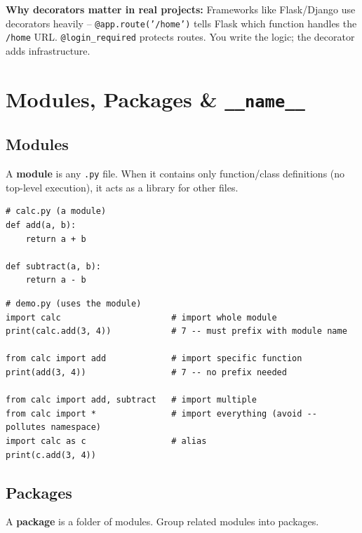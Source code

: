 \documentclass[12pt,a4paper]{article}
\newcommand{\code}[1]{\texttt{\small\color{pyblue}#1}}
\begin{document}
\begin{notebox}
\textbf{Why decorators matter in real projects:} Frameworks like Flask/Django use decorators heavily -- \code{@app.route('/home')} tells Flask which function handles the \code{/home} URL. \code{@login\_required} protects routes. You write the logic; the decorator adds infrastructure.
\end{notebox}

\section{Modules, Packages \& \texttt{\_\_name\_\_}}

\subsection{Modules}

A \textbf{module} is any \code{.py} file. When it contains only function/class definitions (no top-level execution), it acts as a library for other files.

\begin{lstlisting}
# calc.py (a module)
def add(a, b):
    return a + b

def subtract(a, b):
    return a - b
\end{lstlisting}

\begin{lstlisting}
# demo.py (uses the module)
import calc                      # import whole module
print(calc.add(3, 4))            # 7 -- must prefix with module name

from calc import add             # import specific function
print(add(3, 4))                 # 7 -- no prefix needed

from calc import add, subtract   # import multiple
from calc import *               # import everything (avoid -- pollutes namespace)
import calc as c                 # alias
print(c.add(3, 4))
\end{lstlisting}

\subsection{Packages}

A \textbf{package} is a folder of modules. Group related modules into packages.
\end{document}
